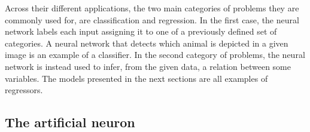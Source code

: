 \documentclass[a4paper,10pt]{report}
\begin{document}
Across their different applications, the two main categories of problems they are commonly used for, are 
classification and regression. In the first case, the neural network labels
each input assigning it to one of a previously defined set of categories.
A neural network that detects which animal is depicted in a given image is an example of a classifier.
In the second category of problems, the neural network is instead used to infer, from the given data, a relation
between some variables.
The models presented in the next sections are all examples of regressors.

\subsection{The artificial neuron}

\end{document}
